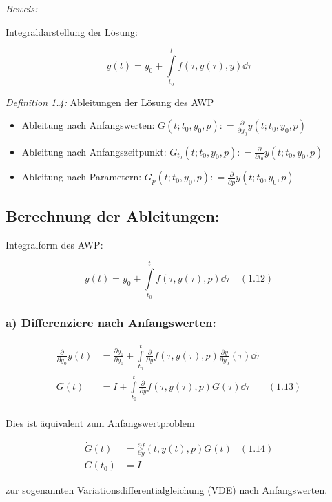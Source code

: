 \emph{Beweis:}

Integraldarstellung der Lösung:

\[ y(t) = y_0 + \int\limits_{t_0}^t f(\tau, y(\tau), y) \dd \tau \]

\emph{Definition 1.4:} Ableitungen der Lösung des AWP

\begin{itemize}
\item Ableitung nach Anfangswerten: $G(t; t_0, y_0, p) \colon= \tfrac{\partial}{\partial y_0} y(t; t_0, y_0, p)$
\item Ableitung nach Anfangszeitpunkt: $G_{t_0}(t; t_0, y_0, p) \colon= \frac{\partial}{\partial t_0} y(t; t_0, y_0, p)$
\item Ableitung nach Parametern: $G_p(t; t_0, y_0, p) \colon= \frac{\partial}{\partial p} y(t; t_0, y_0, p)$
\end{itemize}

\subsection*{Berechnung der Ableitungen:}

Integralform des AWP:

\[y(t) = y_0 + \int\limits_{t_0}^t f(\tau, y(\tau), p) \dd \tau \quad (1.12) \]

\subsubsection*{a) Differenziere nach Anfangswerten:}

\begin{align*}
\frac{\partial}{\partial y_0} y(t) &= \frac{\partial y_0}{\partial y_0} + \int\limits_{t_0}^t \frac{\partial}{\partial y} f(\tau, y(\tau), p) \frac{\partial y}{\partial y_0} (\tau) \dd \tau \\
G(t) &= I + \int\limits_{t_0}^t \frac{\partial}{\partial y} f(\tau, y(\tau), p) G(\tau) \dd \tau & (1.13)\\
\end{align*}

Dies ist äquivalent zum Anfangswertproblem

\begin{align*}
\dot G(t) &= \frac{\partial f}{\partial y} (t, y(t), p) G(t) & (1.14)\\
G(t_0) &= I
\end{align*}

zur sogenannten Variationsdifferentialgleichung (VDE) nach Anfangswerten.

